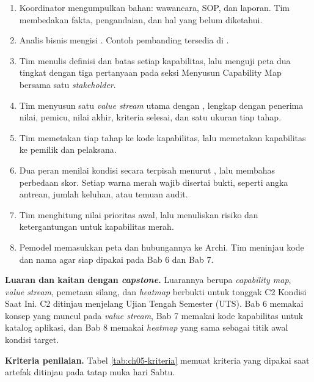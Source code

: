 \begin{enumerate}
  \item Koordinator mengumpulkan bahan: wawancara, SOP, dan laporan. Tim membedakan fakta, pengandaian, dan hal yang
        belum diketahui.
  \item Analis bisnis mengisi . Contoh pembanding tersedia di
        .
  \item Tim menulis definisi dan batas setiap kapabilitas, lalu menguji peta dua tingkat dengan tiga pertanyaan pada
        seksi Menyusun Capability Map bersama satu \textit{stakeholder}.
  \item Tim menyusun satu \textit{value stream} utama dengan , lengkap
        dengan penerima nilai, pemicu, nilai akhir, kriteria selesai, dan satu ukuran tiap tahap.
  \item Tim memetakan tiap tahap ke kode kapabilitas, lalu memetakan kapabilitas ke pemilik dan pelaksana.
  \item Dua peran menilai kondisi secara terpisah menurut , lalu membahas
        perbedaan skor. Setiap warna merah wajib disertai bukti, seperti angka antrean, jumlah keluhan, atau temuan audit.
  \item Tim menghitung nilai prioritas awal, lalu menuliskan risiko dan ketergantungan untuk kapabilitas merah.
  \item Pemodel memasukkan peta dan hubungannya ke Archi. Tim meninjau kode dan nama agar siap dipakai pada Bab 6 dan Bab 7.
\end{enumerate}

\textbf{Luaran dan kaitan dengan \textit{capstone}.} Luarannya berupa \textit{capability map}, \textit{value stream},
pemetaan silang, dan \textit{heatmap} berbukti untuk tonggak C2 Kondisi Saat Ini. C2 ditinjau menjelang Ujian Tengah
Semester (UTS). Bab 6 memakai konsep yang muncul pada \textit{value stream}, Bab 7 memakai kode kapabilitas untuk katalog
aplikasi, dan Bab 8 memakai \textit{heatmap} yang sama sebagai titik awal kondisi target.

\textbf{Kriteria penilaian.} Tabel \ref{tab:ch05-kriteria} memuat kriteria yang dipakai saat artefak ditinjau pada tatap
muka hari Sabtu.

